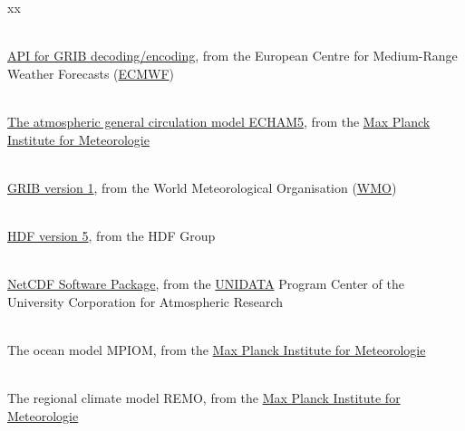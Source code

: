 \begin{thebibliography}{xx}

 \ \\
  \href{https://software.ecmwf.int/wiki/display/ECC/ecCodes+Home}
       {API for GRIB decoding/encoding},
  from the European Centre for Medium-Range Weather Forecasts
  (\href{http://www.ecmwf.int}{ECMWF})


 \ \\
  \href{http://www.mpimet.mpg.de/wissenschaft/publikationen/reports.html}
       {The atmospheric general circulation model ECHAM5},
  from the
  \href{http://www.mpimet.mpg.de}
       {Max Planck Institute for Meteorologie}


 \ \\
  \href{http://www.wmo.ch/web/www/WMOCodes/Guides/GRIB/GRIB1-Contents.html}
       {GRIB version 1},
  from the World Meteorological Organisation
  (\href{http://www.wmo.ch}{WMO})


 \ \\
  \href{http://hdf.ncsa.uiuc.edu/HDF5/}
       {HDF version 5},
  from the HDF Group


 \ \\
  \href{http://www.unidata.ucar.edu/packages/netcdf}{NetCDF Software Package},
  from the
  \href{http://www.unidata.ucar.edu}{UNIDATA}
  Program Center of the University Corporation for Atmospheric Research


 \ \\
  The ocean model MPIOM,
  from the
  \href{http://www.mpimet.mpg.de}
       {Max Planck Institute for Meteorologie}


 \ \\
  The regional climate model REMO,
  from the
  \href{http://www.mpimet.mpg.de}
       {Max Planck Institute for Meteorologie}

\end{thebibliography}
